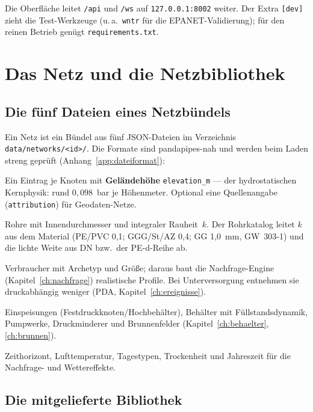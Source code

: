 \documentclass[11pt,a4paper,parskip=half]{scrreprt}
\newcommand{\api}[1]{\texttt{#1}}               %
\newcommand{\file}[1]{\texttt{#1}}              %
\begin{document}
Die Oberfläche leitet \api{/api} und \api{/ws} auf \texttt{127.0.0.1:8002}
weiter. Der Extra \texttt{[dev]} zieht die Test-Werkzeuge (u.\,a.\ \texttt{wntr}
für die EPANET-Validierung); für den reinen Betrieb genügt
\file{requirements.txt}.

\chapter{Das Netz und die Netzbibliothek}
\label{ch:netz}

\section{Die fünf Dateien eines Netzbündels}

Ein Netz ist ein Bündel aus fünf JSON-Dateien im Verzeichnis
\file{data/networks/<id>/}. Die Formate sind pandapipes-nah und werden beim Laden
streng geprüft (Anhang~\ref{app:dateiformat}):

\begin{description}[leftmargin=1.2em]
\item[\file{network\_structure.json}] Ein Eintrag je Knoten mit \textbf{Geländehöhe}
  \texttt{elevation\_m} — der hydrostatischen Kernphysik: rund $0{,}098$~bar je
  Höhenmeter. Optional eine Quellenangabe (\texttt{attribution}) für Geodaten-Netze.
\item[\file{pipes.json}] Rohre mit Innendurchmesser und integraler Rauheit~$k$.
  Der Rohrkatalog leitet $k$ aus dem Material (PE/PVC 0{,}1; GGG/St/AZ 0{,}4;
  GG 1{,}0~mm, GW~303-1) und die lichte Weite aus DN bzw.\ der PE-d-Reihe ab.
\item[\file{consumers.json}] Verbraucher mit Archetyp und Größe; daraus baut die
  Nachfrage-Engine (Kapitel~\ref{ch:nachfrage}) realistische Profile. Bei
  Unterversorgung entnehmen sie druckabhängig weniger (PDA,
  Kapitel~\ref{ch:ereignisse}).
\item[\file{supply.json}] Einspeisungen (Festdruckknoten/Hochbehälter), Behälter
  mit Füllstandsdynamik, Pumpwerke, Druckminderer und Brunnenfelder
  (Kapitel~\ref{ch:behaelter}, \ref{ch:brunnen}).
\item[\file{environment.json}] Zeithorizont, Lufttemperatur, Tagestypen,
  Trockenheit und Jahreszeit für die Nachfrage- und Wettereffekte.
\end{description}

\section{Die mitgelieferte Bibliothek}
\label{sec:bibliothek}
\end{document}
